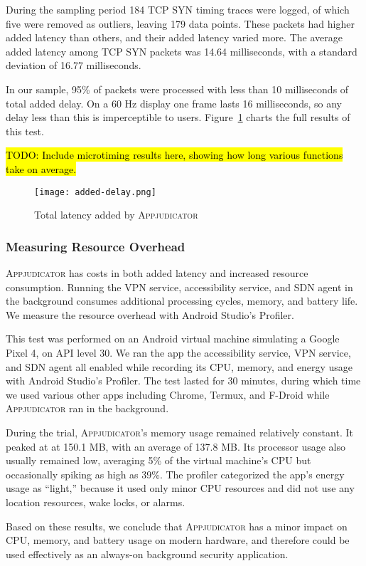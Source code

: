 During the sampling period 184 TCP SYN timing traces were logged, of which five
were removed as outliers, leaving 179 data points. These packets had 
higher added latency than others, and their added latency varied more. The
average added latency among TCP SYN packets was 14.64 milliseconds, with a
standard deviation of 16.77 milliseconds.

In our sample, 95\% of packets were processed with less than 10 milliseconds
of total added delay. On a 60 Hz display one frame lasts 16 milliseconds, so any
delay less than this is imperceptible to users.
Figure~\ref{fig:added-delay-chart} charts the full results of this test.

\hl{TODO: Include microtiming results here, showing how long various functions
	take on average.}

\begin{figure}[h]
    \centering
	\texttt{[image: added-delay.png]}
	\caption{Total latency added by \textsc{Appjudicator}}
	\label{fig:added-delay-chart}
\end{figure}

\subsubsection{Measuring Resource Overhead}
\label{sec:measuring-resource-overhead}

\textsc{Appjudicator} has costs in both added latency and increased resource
consumption. Running the VPN service, accessibility service, and SDN agent in
the background consumes additional processing cycles, memory, and battery life.
We measure the resource overhead with Android Studio's
Profiler.~\cite{androidprofiler}

This test was performed on an Android virtual machine simulating a Google Pixel
4, on API level 30. We ran the app the accessibility service, VPN service, and
SDN agent all enabled while recording its CPU, memory, and energy usage with
Android Studio's Profiler. The test lasted for 30 minutes, during which time we
used various other apps including Chrome, Termux, and F-Droid while
\textsc{Appjudicator} ran in the background.

During the trial, \textsc{Appjudicator}'s memory usage remained relatively
constant. It peaked at at 150.1 MB, with an average of 137.8 MB. Its processor
usage also usually remained low, averaging 5\% of the virtual machine's CPU but
occasionally spiking as high as 39\%. The profiler categorized the app's energy
usage as ``light,'' because it used only minor CPU resources and did not use any
location resources, wake locks, or alarms.

Based on these results, we conclude that \textsc{Appjudicator} has a minor
impact on CPU, memory, and battery usage on modern hardware, and therefore could
be used effectively as an always-on background security application.

\newpage

